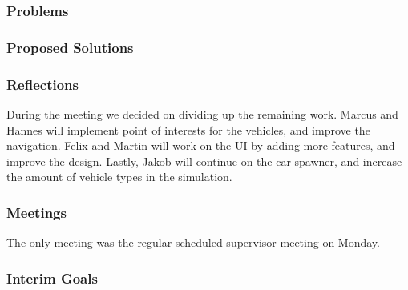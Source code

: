 \subsubsection{Problems}
    

\subsubsection{Proposed Solutions}


\subsubsection{Reflections}

    During the meeting we decided on dividing up the remaining work. Marcus and Hannes will implement point of interests for the vehicles, and improve the navigation. Felix and Martin will work on the UI by adding more features, and improve the design. Lastly, Jakob will continue on the car spawner, and increase the amount of vehicle types in the simulation.

\subsubsection{Meetings}

    The only meeting was the regular scheduled supervisor meeting on Monday.

\subsubsection{Interim Goals}


